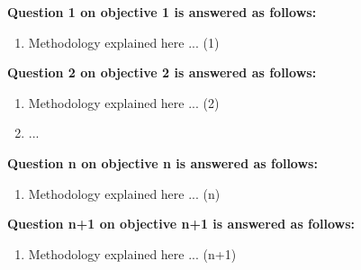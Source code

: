 


\textbf{Question 1 on objective 1 is answered as follows:}
\begin{enumerate}[left=0pt, align=left, label={}]

    \item Methodology explained here ... (1) \\

    
\end{enumerate}
\textbf{Question 2 on objective 2 is answered as follows:}
\begin{enumerate}[resume, left=0pt, align=left, label={}]
    
    \item Methodology explained here ... (2)

    \item ...
    
\end{enumerate}
\textbf{Question n on objective n is answered as follows:}
\begin{enumerate}[resume, left=0pt, align=left, label={}]
    
    \item Methodology explained here ... (n)

\end{enumerate}
\textbf{Question n+1 on objective n+1 is answered as follows:}
\begin{enumerate}[resume, left=0pt, align=left, label={}]
    
    \item Methodology explained here ... (n+1)

\end{enumerate}